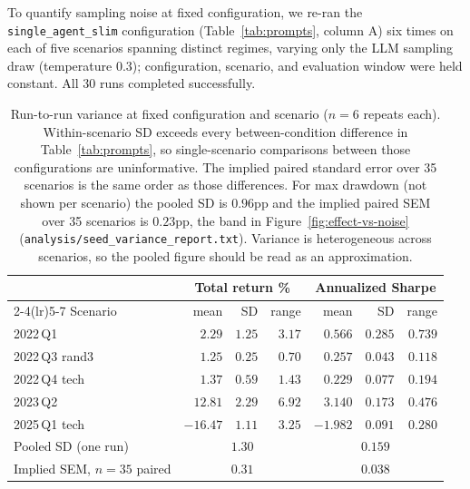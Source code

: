 \documentclass{article}
\begin{document}
To quantify sampling noise at fixed configuration, we re-ran the
\texttt{single\_agent\_slim} configuration (Table~\ref{tab:prompts}, column A) six times on
each of five scenarios spanning distinct regimes, varying only the LLM sampling draw
(temperature 0.3); configuration, scenario, and evaluation window were held constant.
All 30 runs completed successfully.

\begin{table}[H]
\centering\small
\begin{tabular}{lrrrrrr}
\toprule
& \multicolumn{3}{c}{Total return \%} & \multicolumn{3}{c}{Annualized Sharpe} \\
\cmidrule(lr){2-4}\cmidrule(lr){5-7}
Scenario & mean & SD & range & mean & SD & range \\
\midrule
2022\,Q1              & $2.29$   & $1.25$ & $3.17$ & $0.566$  & $0.285$ & $0.739$ \\
2022\,Q3 rand3        & $1.25$   & $0.25$ & $0.70$ & $0.257$  & $0.043$ & $0.118$ \\
2022\,Q4 tech         & $1.37$   & $0.59$ & $1.43$ & $0.229$  & $0.077$ & $0.194$ \\
2023\,Q2              & $12.81$  & $2.29$ & $6.92$ & $3.140$  & $0.173$ & $0.476$ \\
2025\,Q1 tech         & $-16.47$ & $1.11$ & $3.25$ & $-1.982$ & $0.091$ & $0.280$ \\
\midrule
Pooled SD (one run)   & \multicolumn{3}{c}{$1.30$} & \multicolumn{3}{c}{$0.159$} \\
Implied SEM, $n{=}35$ paired & \multicolumn{3}{c}{$0.31$} & \multicolumn{3}{c}{$0.038$} \\
\bottomrule
\end{tabular}
\vspace{4pt}
\caption{Run-to-run variance at fixed configuration and scenario ($n{=}6$ repeats each).
Within-scenario SD exceeds every between-condition difference in
Table~\ref{tab:prompts}, so single-scenario comparisons between those configurations are
uninformative. The implied paired standard error over 35 scenarios is the same order as
those differences. For max drawdown (not shown per scenario) the pooled SD is $0.96$pp and the
implied paired SEM over 35 scenarios is $0.23$pp, the band in Figure~\ref{fig:effect-vs-noise}
(\texttt{analysis/seed\_variance\_report.txt}). Variance is heterogeneous across scenarios, so the pooled figure should
be read as an approximation.}
\label{tab:seed-variance}
\end{table}
\end{document}
